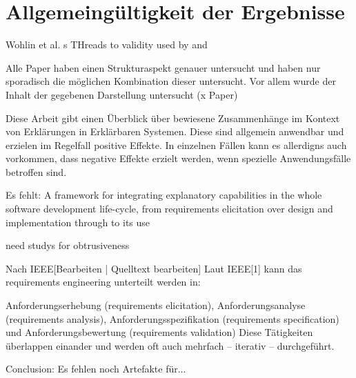 \section{Allgemeingültigkeit der Ergebnisse}

Wohlin et al. s THreads to validity \cite{wohlin2012experimentation} used by \cite{ghazi2016exploratory} and \cite{carvalho2020developers}

Alle Paper haben einen Strukturaspekt genauer untersucht und haben nur sporadisch die möglichen Kombination dieser untersucht. Vor allem wurde der Inhalt der gegebenen Darstellung untersucht (x Paper)

Diese Arbeit gibt einen Überblick über bewiesene Zusammenhänge im Kontext von Erklärungen in Erklärbaren Systemen. Diese sind allgemein anwendbar und erzielen im Regelfall positive Effekte. In einzelnen Fällen kann es allerdigns auch vorkommen, dass negative Effekte erzielt werden, wenn spezielle Anwendungsfälle betroffen sind.

Es fehlt: A framework for integrating explanatory capabilities in the whole software development life-cycle, from requirements elicitation over design and implementation through to its use \cite{cassens_ambient_2019}

need studys for obtrusiveness \cite{lim_2009_assessing}

Nach IEEE[Bearbeiten | Quelltext bearbeiten]
Laut IEEE[1] kann das requirements engineering unterteilt werden in:

Anforderungserhebung (requirements elicitation),
Anforderungsanalyse (requirements analysis),
Anforderungsspezifikation (requirements specification) und
Anforderungsbewertung (requirements validation)
Diese Tätigkeiten überlappen einander und werden oft auch mehrfach – iterativ – durchgeführt.

Conclusion: Es fehlen noch Artefakte für...